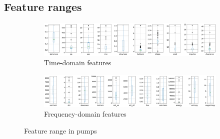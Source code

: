 \subsection{Feature ranges}


\begin{figure}[h]
    \centering
    \begin{subfigure}[b]{\textwidth}
        \includegraphics[width=\textwidth]{assets/results/feature-values/pumps-TD-dim-3.png}
        \caption{Time-domain features}
    \end{subfigure}
    \hfill
    \begin{subfigure}[b]{\textwidth}
        \includegraphics[width=\textwidth]{assets/results/feature-values/pumps-FD-dim-3.png}
        \caption{Frequency-domain features}
    \end{subfigure}
    \caption{Feature range in pumps}
\end{figure}

